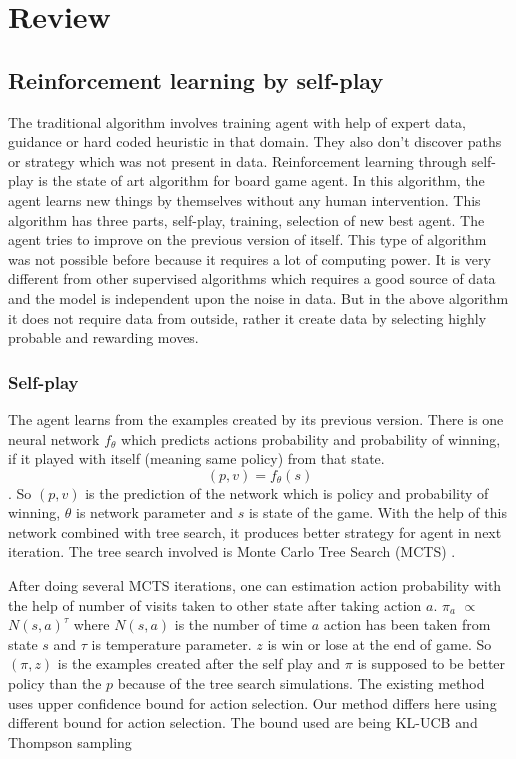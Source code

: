\chapter{Review}

\section{Reinforcement learning by self-play}
The traditional algorithm involves training agent with help of expert data, guidance or hard coded heuristic in that domain. They also don't discover paths or strategy which was not present in data. Reinforcement learning through self-play \cite{alphagozero} is the state of art algorithm for board game agent. In this algorithm, the agent learns new things by themselves without any human intervention. This algorithm has three parts, self-play, training, selection of new best agent. The agent tries to improve on the previous version of itself. This type of algorithm was not possible before because it requires a lot of computing power. It is very different from other supervised algorithms which requires a good source of data and the model is independent upon the noise in data. But in the above algorithm it does not require data from outside, rather it create data by selecting highly probable and rewarding moves.


\subsection{Self-play}
The agent learns from the examples created by its previous version. There is one neural network $f_{\theta}$ which predicts actions probability and probability of winning, if it played with itself (meaning same policy) from that state. $$ (p,v) = f_{\theta}(s) $$. So $(p,v)$ is the prediction of the network which is policy and probability of winning, $\theta$ is network parameter and $s$ is state of the game. With the help of this network combined with tree search, it produces better strategy for agent in next iteration. The tree search involved is Monte Carlo Tree Search (MCTS) \cite{alphagozero}.


After doing several MCTS iterations, one can estimation action probability with the help of number of visits taken to other state after taking action $a$.
$ \pi_{a} $ $ \propto $ $N(s,a)^{\tau}$ where $N(s,a)$ is the number of time $a$ action has been taken from state $s$ and $\tau$ is temperature parameter. $z$ is win or lose at the end of game. So $(\pi,z)$ is the examples created after the self play and $\pi$ is supposed to be better policy than the $p$ because of the tree search simulations.
The existing method uses upper confidence bound for action selection. Our method differs here using different bound for action selection. The bound used are being KL-UCB \cite{klucb} and Thompson sampling \cite{thompson}
